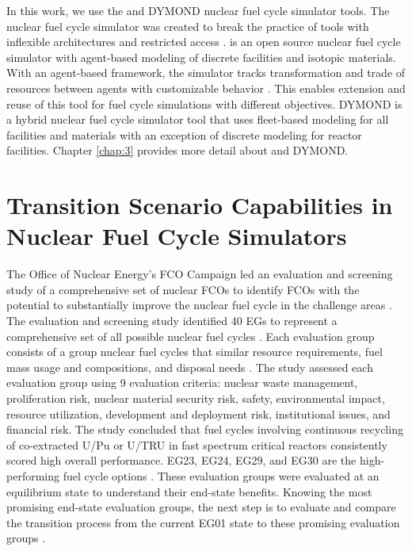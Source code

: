In this work, we use the \Cyclus and DYMOND nuclear fuel cycle simulator tools. 
The \Cyclus nuclear fuel cycle simulator was created to break the practice of 
tools with inflexible architectures and restricted access \cite{huff_fundamental_2016}.
\Cyclus is an open source nuclear fuel cycle simulator with agent-based 
modeling of discrete facilities and isotopic materials. 
With an agent-based framework, the simulator tracks transformation and 
trade of resources between agents with customizable behavior
\cite{huff_fundamental_2016}. 
This enables extension and reuse of this tool for fuel cycle 
simulations with different objectives. 
DYMOND is a hybrid nuclear fuel cycle simulator tool that uses fleet-based 
modeling for all facilities and materials 
with an exception of discrete modeling for reactor facilities. 
Chapter \ref{chap:3} provides more detail about \Cyclus and DYMOND. 

\section{Transition Scenario Capabilities in Nuclear Fuel Cycle Simulators}
\label{sec:egs}
The Office of Nuclear Energy's
\gls{FCO} Campaign led an evaluation 
and screening study of a comprehensive set of nuclear \glspl{FCO} 
to identify \glspl{FCO} with the potential to substantially 
improve the nuclear fuel cycle in the challenge areas
\cite{wigeland_nuclear_2014}. 
The evaluation and screening study identified 40 
\glspl{EG} to represent a comprehensive set of 
all possible nuclear fuel cycles \cite{wigeland_nuclear_2014}. 
Each evaluation group consists of a group nuclear fuel cycles that
similar resource requirements, fuel mass usage and compositions, 
and disposal needs \cite{wigeland_nuclear_2014}. 
The study assessed each evaluation group using 
9 evaluation criteria: nuclear waste management, 
proliferation risk, nuclear material security risk, 
safety, environmental impact, resource utilization, 
development and deployment risk, institutional issues, and 
financial risk.  
The study concluded that fuel cycles
involving continuous recycling of co-extracted U/Pu or U/TRU in 
fast spectrum critical reactors consistently scored high overall 
performance.
EG23, EG24, EG29, and EG30 are the high-performing fuel cycle options
\cite{wigeland_nuclear_2014}.
These evaluation groups were evaluated at an equilibrium state to 
understand their end-state benefits.
Knowing the most promising end-state evaluation groups,
the next step is to evaluate and compare the transition process 
from the current EG01 
state to these promising evaluation groups \cite{feng_standardized_2016}. 

